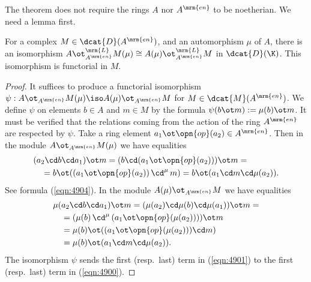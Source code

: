 The theorem does not require the rings $A$ nor $A^{\mrm{en}}$ to be noetherian.
We need a lemma first. 

\begin{lem} \label{lem:4895}
For a complex $M \in \dcat{D}(A^{\mrm{en}})$, and an automorphism $\mu$ of 
$A$, there is an isomorphism 
$A \ot^{\mrm{L}}_{A^{\mrm{en}}} M(\mu) \cong 
A(\mu) \ot^{\mrm{L}}_{A^{\mrm{en}}} M$
in $\dcat{D}(\K)$. This isomorphism is functorial in $M$. 
\end{lem}

\begin{proof}
It suffices to produce a functorial isomorphism 
$\psi : A \ot_{A^{\mrm{en}}} M(\mu) \iso A(\mu) \ot_{A^{\mrm{en}}} M$
for $M \in \dcat{M}(A^{\mrm{en}})$. 
We define $\psi$ on elements $b \in A$ and $m \in M$ by the formula
$\psi(b \ot m) := \mu(b) \ot m$.
It must be verified that the relations coming from 
the action of the ring $A^{\mrm{en}}$ are respected by $\psi$. 
Take a ring element $a_1 \ot \opn{op}(a_2) \in A^{\mrm{en}}$. Then in the 
module $A \ot_{A^{\mrm{en}}} M(\mu)$ we have equalities
\begin{equation} \label{eqn:4901}
\begin{aligned}
& 
(a_2 \cd b \cd a_1) \ot m = (b \cd (a_1 \ot \opn{op}(a_2))) \ot m = 
\\ & \quad
= b \ot ((a_1 \ot \opn{op}(a_2)) \, \cd^{\mu} \, m) = 
b \ot (a_1 \cd m \cd \mu(a_2)) . 
\end{aligned}
\end{equation}
See formula (\ref{eqn:4904}). In the module $A(\mu) \ot_{A^{\mrm{en}}} M$ 
we have equalities
\begin{equation} \label{eqn:4900}
\begin{aligned} 
& 
\mu(a_2 \cd b \cd a_1) \ot m = 
(\mu(a_2) \cd \mu(b) \cd \mu(a_1)) \ot m = 
\\ & \quad
= (\mu(b) \, \cd^{\mu} \, (a_1 \ot \opn{op}(\mu(a_2)))) \ot m 
\\ & \quad
= \mu(b) \ot ((a_1 \ot \opn{op}(\mu(a_2))) \cd m) 
\\ & \quad
= \mu(b) \ot (a_1 \cd m \cd \mu(a_2))  .
\end{aligned}
\end{equation}
The isomorphism $\psi$ sends the first (resp.\ last) term in (\ref{eqn:4901}) 
to the first  (resp.\ last) term in (\ref{eqn:4900}). 
\end{proof}

